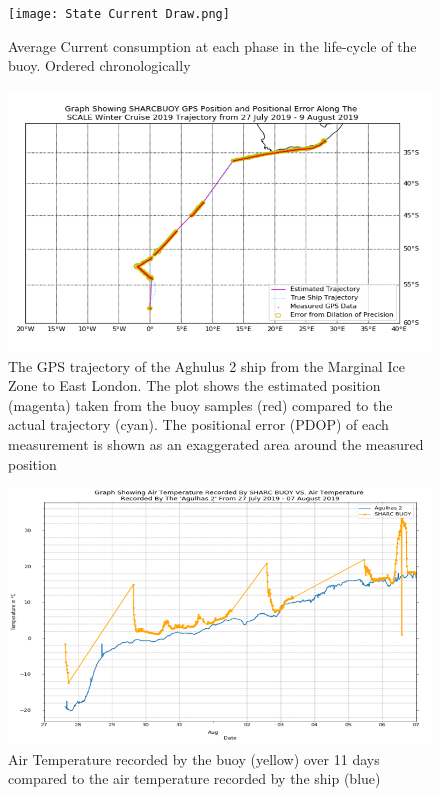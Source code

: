\begin{figure}[H]
    \centering
    \texttt{[image: State Current Draw.png]}
    \caption{Average Current consumption at each phase in the life-cycle of the buoy. Ordered chronologically}
    \label{fig:test_powtest_avgcurr}
\end{figure}

\begin{figure}[H]
    \centering
    \includegraphics[scale=0.5]{gps_trajectory_scale2019.png}
    \caption{The GPS trajectory of the Aghulus 2 ship from the Marginal Ice Zone to East London. The plot shows the estimated position (magenta) taken from the buoy samples (red) compared to the actual trajectory (cyan). The positional error (PDOP) of each measurement is shown as an exaggerated area around the measured position}
    \label{fig:test_deploymenttest_GPS}
\end{figure}

\begin{figure}[H]
    \centering
    \includegraphics[scale=0.5]{temp_test_scale2019.png}
    \caption{Air Temperature recorded by the buoy (yellow) over 11 days compared to the air temperature recorded by the ship (blue) }
    \label{fig:test_deploymenttest_temp}
\end{figure}